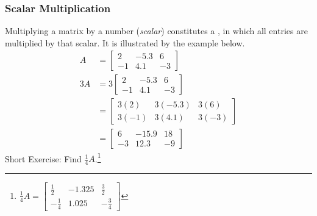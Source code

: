 \subsubsection{Scalar Multiplication} Multiplying a matrix by a number (\textit{scalar}) constitutes a , in which all entries are multiplied by that scalar. It is illustrated by the example below.
\begin{align*}
A &= 
\begin{bmatrix}
2 & -5.3 & 6 \\
-1 & 4.1 & -3
\end{bmatrix} \\
3A &= 3
\begin{bmatrix}
2 & -5.3 & 6 \\
-1 & 4.1 & -3
\end{bmatrix} \\
&=
\begin{bmatrix}
3(2) & 3(-5.3) & 3(6) \\
3(-1) & 3(4.1) & 3(-3)
\end{bmatrix} \\
&=
\begin{bmatrix}
6 & -15.9 & 18 \\
-3 & 12.3 & -9
\end{bmatrix}
\end{align*}
Short Exercise: Find $\frac{1}{4}A$.\footnote{$\frac{1}{4}A = \begin{bmatrix}
\frac{1}{2} & -1.325 & \frac{3}{2} \\
-\frac{1}{4} & 1.025 & -\frac{3}{4}
\end{bmatrix}$}

